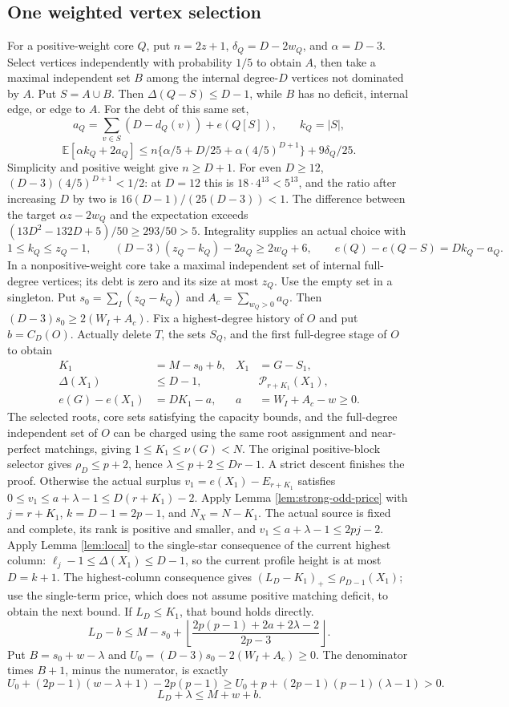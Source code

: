 \documentclass[11pt,a4paper]{article}
\newcommand{\p}{\mathcal P}
\newcommand{\floor}[1]{\left\lfloor#1\right\rfloor}
\theoremstyle{definition}
\begin{document}
\subsection{One weighted vertex selection}
For a positive-weight core $Q$, put $n=2z+1$, $\delta_Q=D-2w_Q$, and $\alpha=D-3$. Select vertices independently with probability $1/5$ to obtain $A$, then take a maximal independent set $B$ among the internal degree-$D$ vertices not dominated by $A$. Put $S=A\cup B$. Then $\Delta(Q-S)\le D-1$, while $B$ has no deficit, internal edge, or edge to $A$. For the debt of this same set,
\[
a_Q=\sum_{v\in S}(D-d_Q(v))+e(Q[S]),\qquad k_Q=|S|,
\]
\[
\mathbb E[\alpha k_Q+2a_Q]\le
n\{\alpha/5+D/25+\alpha(4/5)^{D+1}\}+9\delta_Q/25.
\]
Simplicity and positive weight give $n\ge D+1$. For even $D\ge12$,
$(D-3)(4/5)^{D+1}<1/2$: at $D=12$ this is
$18\cdot4^{13}<5^{13}$, and the ratio after increasing $D$ by two is
$16(D-1)/(25(D-3))<1$.
The difference between the target $\alpha z-2w_Q$ and the expectation exceeds
$(13D^2-132D+5)/50\ge293/50>5$.
Integrality supplies an actual choice with
\[
1\le k_Q\le z_Q-1,\qquad
(D-3)(z_Q-k_Q)-2a_Q\ge2w_Q+6,\qquad
e(Q)-e(Q-S)=Dk_Q-a_Q.
\]
In a nonpositive-weight core take a maximal independent set of internal full-degree vertices; its debt is zero and its size at most $z_Q$. Use the empty set in a singleton. Put $s_0=\sum_I(z_Q-k_Q)$ and $A_c=\sum_{w_Q>0}a_Q$. Then
$(D-3)s_0\ge2(W_I+A_c)$.
Fix a highest-degree history of $O$ and put $b=C_D(O)$. Actually delete $T$, the sets $S_Q$, and the first full-degree stage of $O$ to obtain
\[
\begin{aligned}
K_1&=M-s_0+b, & X_1&=G-S_1,\\
\Delta(X_1)&\le D-1, & &\p_{r+K_1}(X_1),\\
e(G)-e(X_1)&=DK_1-a, & a&=W_I+A_c-w\ge0.
\end{aligned}
\]
The selected roots, core sets satisfying the capacity bounds, and the full-degree independent set of $O$ can be charged using the same root assignment and near-perfect matchings, giving $1\le K_1\le\nu(G)<N$. The original positive-block selector gives $\rho_D\le p+2$, hence $\lambda\le p+2\le Dr-1$. A strict descent finishes the proof. Otherwise the actual surplus
$v_1=e(X_1)-E_{r+K_1}$ satisfies
$0\le v_1\le a+\lambda-1\le D(r+K_1)-2$.
Apply Lemma \ref{lem:strong-odd-price} with $j=r+K_1$, $k=D-1=2p-1$, and $N_X=N-K_1$. The actual source is fixed and complete, its rank is positive and smaller, and $v_1\le a+\lambda-1\le2pj-2$. Apply Lemma \ref{lem:local} to the single-star consequence of the current highest column: $\ell_j-1\le\Delta(X_1)\le D-1$, so the current profile height is at most $D=k+1$. The highest-column consequence gives $(L_D-K_1)_+\le\rho_{D-1}(X_1)$; use the single-term price, which does not assume positive matching deficit, to obtain the next bound. If $L_D\le K_1$, that bound holds directly.
\[
L_D-b\le M-s_0+
\floor{\frac{2p(p-1)+2a+2\lambda-2}{2p-3}}.
\]
Put $B=s_0+w-\lambda$ and $U_0=(D-3)s_0-2(W_I+A_c)\ge0$. The denominator times $B+1$, minus the numerator, is exactly
\[
U_0+(2p-1)(w-\lambda+1)-2p(p-1)
\ge U_0+p+(2p-1)(p-1)(\lambda-1)>0.
\]
\begin{equation}\label{eq:weighted-top}
L_D+\lambda\le M+w+b.
\end{equation}
\end{document}
